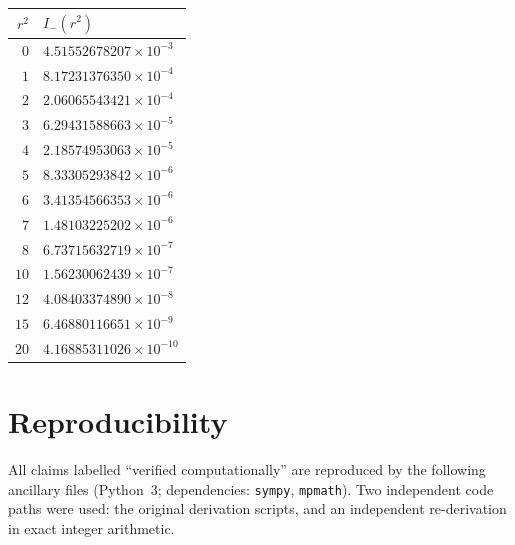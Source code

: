 \documentclass[11pt,reqno]{amsart}
\theoremstyle{plain}
\theoremstyle{definition}
\theoremstyle{remark}
\newcommand{\Imm}{I_{-}}
\begin{document}
\begin{center}
\small
\begin{tabular}{rl}
\toprule
$r^2$ & $\Imm(r^2)$ \\
\midrule
$0$ & $4.51552678207\times10^{-3}$ \\
$1$ & $8.17231376350\times10^{-4}$ \\
$2$ & $2.06065543421\times10^{-4}$ \\
$3$ & $6.29431588663\times10^{-5}$ \\
$4$ & $2.18574953063\times10^{-5}$ \\
$5$ & $8.33305293842\times10^{-6}$ \\
$6$ & $3.41354566353\times10^{-6}$ \\
$7$ & $1.48103225202\times10^{-6}$ \\
$8$ & $6.73715632719\times10^{-7}$ \\
$10$ & $1.56230062439\times10^{-7}$ \\
$12$ & $4.08403374890\times10^{-8}$ \\
$15$ & $6.46880116651\times10^{-9}$ \\
$20$ & $4.16885311026\times10^{-10}$ \\
\bottomrule
\end{tabular}
\end{center}

\section{Reproducibility}\label{app:repro}

All claims labelled ``verified computationally'' are reproduced by the
following ancillary files (Python~3; dependencies: \texttt{sympy},
\texttt{mpmath}).  Two independent code paths were used: the original
derivation scripts, and an independent re-derivation in exact integer
arithmetic.
\end{document}
